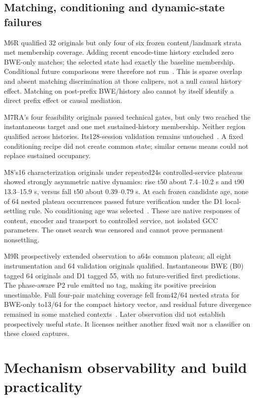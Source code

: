 \documentclass[10pt]{article}
\begin{document}
\subsection{Matching, conditioning and dynamic-state failures}
M6R qualified 32 originals but only four of six frozen content/landmark strata
met membership coverage. Adding recent encode-time history excluded zero
BWE-only matches; the selected state had exactly the baseline membership.
Conditional future comparisons were therefore not run~\cite{m6r}. This is sparse
overlap and absent matching discrimination at those calipers, not a null causal
history effect. Matching on post-prefix BWE/history also cannot by itself identify
a direct prefix effect or causal mediation.

M7RA's four feasibility originals passed technical gates, but only two reached
the instantaneous target and one met sustained-history membership. Neither
region qualified across histories. Its128-session validation remains
untouched~\cite{m7ra}. A fixed conditioning recipe did not create common state;
similar census means could not replace sustained occupancy.

M8's16 characterization originals under repeated24s controlled-service plateaus
showed strongly asymmetric native dynamics: rise t50 about 7.4--10.2 s and t90
13.3--15.9 s, versus fall t50 about 0.39--0.79 s. At each frozen candidate age,
none of 64 nested plateau occurrences passed future verification under the D1
local-settling rule. No conditioning age was selected~\cite{m8}. These are native
responses of content, encoder and transport to controlled service, not isolated
GCC parameters. The onset search was censored and cannot prove permanent
nonsettling.

M9R prospectively extended observation to a64s common plateau; all eight
instrumentation and 64 validation originals qualified. Instantaneous BWE (B0)
tagged 64 originals and D1 tagged 55, with no future-verified first predictions.
The phase-aware P2 rule emitted no tag, making its positive precision
unestimable. Full four-pair matching coverage fell from42/64 nested strata for
BWE-only to13/64 for the compact history vector, and residual future divergence
remained in some matched contexts~\cite{m9r}. Later observation did not establish
prospectively useful state. It licenses neither another fixed wait nor a
classifier on these closed captures.

\section{Mechanism observability and build practicality}
\end{document}
